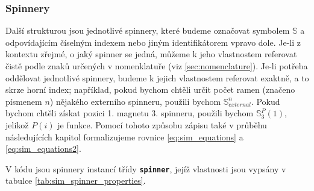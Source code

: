 \subsubsection{Spinnery}

Další strukturou jsou jednotlivé spinnery, které budeme označovat symbolem $\mathbb{S}$ a odpovídajícím číselným indexem nebo jiným identifikátorem vpravo dole. Je-li z kontextu zřejmé, o jaký spinner se jedná, můžeme k jeho vlastnostem referovat čistě podle znaků určených v nomenklatuře (viz \autoref{sec:nomenclature}). Je-li potřeba oddělovat jednotlivé spinnery, budeme k jejich vlastnostem referovat exaktně, a to skrze horní index; například, pokud bychom chtěli určit počet ramen (značeno písmenem $n$) nějakého externího spinneru, použili bychom $\mathbb{S}_{external}^{n}$. Pokud bychom chtěli získat pozici 1. magnetu 3. spinneru, použili bychom $\mathbb{S}_{3}^{P}(1)$, jelikož $P(i)$ je funkce. Pomocí tohoto způsobu zápisu také v průběhu následujících kapitol formalizujeme rovnice \ref{eq:sim_equations} a \ref{eq:sim_equations2}.

V kódu jsou spinnery instancí třídy \textbf{\texttt{spinner}}, jejíž vlastnosti jsou vypsány v tabulce \ref{tab:sim_spinner_properties}.

